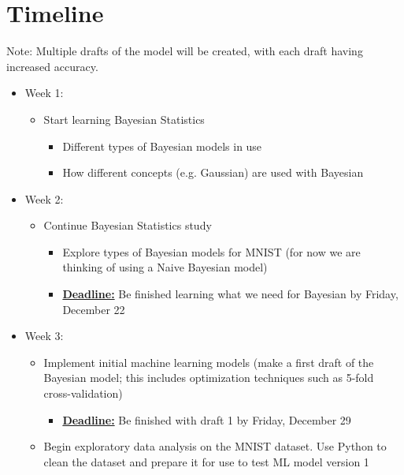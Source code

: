 \documentclass{notes}
\begin{document}
\section{Timeline}
\vspace{-\baselineskip}
Note: Multiple drafts of the model will be created, with each draft having increased accuracy.
\vspace{-\baselineskip}
\vspace{-\baselineskip}
\begin{itemize}
    \item Week 1:
        \begin{itemize}
            \item Start learning Bayesian Statistics
            \begin{itemize}
                \item Different types of Bayesian models in use
                \item How different concepts (e.g. Gaussian) are used with Bayesian
            \end{itemize}
        \end{itemize}
    \item Week 2:
        \begin{itemize}
            \item Continue Bayesian Statistics study
            \begin{itemize}
                \item Explore types of Bayesian models for MNIST (for now we are thinking of using a Naive Bayesian model)
                \item \underline{\textbf{Deadline:}} Be finished learning what we need for Bayesian by Friday, December 22
            \end{itemize}
        \end{itemize}
    \item Week 3:
        \begin{itemize}
            \item Implement initial machine learning models (make a first draft of the Bayesian model; this includes optimization techniques such as 5-fold cross-validation)
            \begin{itemize}
                \item \underline{\textbf{Deadline:}} Be finished with draft 1 by Friday, December 29
            \end{itemize}
            \item Begin exploratory data analysis on the MNIST dataset. Use Python to clean the dataset and prepare it for use to test ML model version 1

\end{itemize}
\end{itemize}
\end{document}
